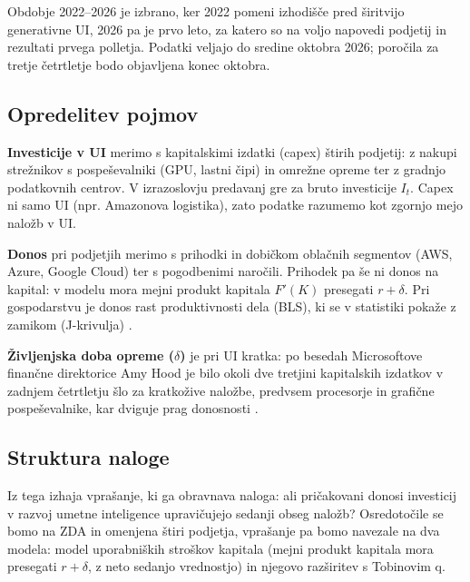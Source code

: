 \documentclass[12pt,a4paper]{article}
\begin{document}
Obdobje 2022--2026 je izbrano, ker 2022 pomeni izhodišče pred širitvijo generativne UI, 2026 pa je prvo leto, za katero so na voljo napovedi podjetij in rezultati prvega polletja. Podatki veljajo do sredine oktobra 2026; poročila za tretje četrtletje bodo objavljena konec oktobra.

\subsection{Opredelitev pojmov}

\textbf{Investicije v UI} merimo s kapitalskimi izdatki (capex) štirih podjetij: z nakupi strežnikov s pospeševalniki (GPU, lastni čipi) in omrežne opreme ter z gradnjo podatkovnih centrov. V izrazoslovju predavanj gre za bruto investicije $I_t$. Capex ni samo UI (npr. Amazonova logistika), zato podatke razumemo kot zgornjo mejo naložb v UI.

\textbf{Donos} pri podjetjih merimo s prihodki in dobičkom oblačnih segmentov (AWS, Azure, Google Cloud) ter s pogodbenimi naročili. Prihodek pa še ni donos na kapital: v modelu mora mejni produkt kapitala $F'(K)$ presegati $r + \delta$. Pri gospodarstvu je donos rast produktivnosti dela (BLS), ki se v statistiki pokaže z zamikom (J-krivulja) \citep{BLSLabourProductivity}.

\textbf{Življenjska doba opreme ($\delta$)} je pri UI kratka: po besedah Microsoftove finančne direktorice Amy Hood je bilo okoli dve tretjini kapitalskih izdatkov v zadnjem četrtletju šlo za kratkožive naložbe, predvsem procesorje in grafične pospeševalnike, kar dviguje prag donosnosti \citep{MicrosoftFY26Q4Call}.

\subsection{Struktura naloge}

Iz tega izhaja vprašanje, ki ga obravnava naloga: ali pričakovani donosi investicij v razvoj umetne inteligence upravičujejo sedanji obseg naložb? Osredotočile se bomo na ZDA in omenjena štiri podjetja, vprašanje pa bomo navezale na dva modela: model uporabniških stroškov kapitala (mejni produkt kapitala mora presegati $r + \delta$, z neto sedanjo vrednostjo) in njegovo razširitev s Tobinovim q.
\end{document}
